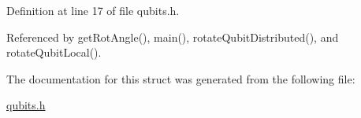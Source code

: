 Definition at line 17 of file qubits.\+h.



Referenced by get\+Rot\+Angle(), main(), rotate\+Qubit\+Distributed(), and rotate\+Qubit\+Local().



The documentation for this struct was generated from the following file\+:\begin{DoxyCompactItemize}
\item 
\hyperlink{qubits_8h}{qubits.\+h}\end{DoxyCompactItemize}
